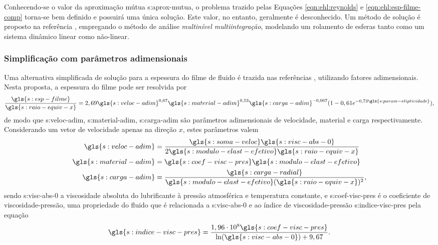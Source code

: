 \documentclass[12pt,oneside,english,brazil,lmodern,siglas,simbolos,cite=num]{ucsmonograph}
\begin{document}
	Conhecendo-se o valor da aproximação mútua \gls{s:aprox-mutua}, o problema trazido pelas Equações \ref{eqn:ehl:reynolds} e \ref{eqn:ehl:esp-filme-comp} torna-se bem definido e possuirá uma única solução.
	Este valor, no entanto, geralmente é desconhecido.
	Um método de solução é proposto na referência \cite{nonato:2010}, empregando o método de análise \emph{multinível multiintegração}, modelando um rolamento de esferas tanto como um sistema dinâmico linear como não-linear.
	
	\subsubsection{Simplificação com parâmetros adimensionais} \label{sec:ehl:simpl}
	Uma alternativa simplificada de solução para a espessura do filme de fluido é trazida nas referências \cite{hamrock:1991,spikes:2006}, utilizando fatores adimensionais.
	Nesta proposta, a espessura do filme pode ser resolvida por
	\begin{equation} \label{eqn:ehl:esp-filme}
		\frac{\gls{s:esp-filme}}{\gls{s:raio-equiv-x}} = 
		2,69\gls{s:veloc-adim}^{0,67}\gls{s:material-adim}^{0,53}
		\gls{s:carga-adim}^{-0,067}
		(1-0,61e^{-0,73\gls{s:param-elipticidade}}),
	\end{equation}
	de modo que \gls{s:veloc-adim}, \gls{s:material-adim}, \gls{s:carga-adim} são parâmetros adimensionais de velocidade, material e carga respectivamente.
	Considerando um vetor de velocidade apenas na direção $x$, estes parâmetros valem \cite{hamrock:1991}
	\begin{align}
		\gls{s:veloc-adim} &= \frac{\gls{s:soma-veloc}\gls{s:visc-abs-0}}
		{2\gls{s:modulo-elast-efetivo}\gls{s:raio-equiv-x}}
		\label{eqn:ehl:veloc-adim}\\
		\gls{s:material-adim} &= \gls{s:coef-visc-pres}
		\gls{s:modulo-elast-efetivo} \label{eqn:ehl:material-adim}\\
		\gls{s:carga-adim} &= \frac{\gls{s:carga-radial}}
		{\gls{s:modulo-elast-efetivo}(\gls{s:raio-equiv-x})^2}
		\label{eqn:ehl:carga-adim},
	\end{align}
	sendo \gls{s:visc-abs-0} a viscosidade absoluta do lubrificante à pressão atmosférica e temperatura constante, e \gls{s:coef-visc-pres} é o coeficiente de viscosidade-pressão, uma propriedade do fluido que é relacionada a \gls{s:visc-abs-0} e ao índice de viscosidade-pressão \gls{s:indice-visc-pres} pela equação \cite{wijnant:1998}
	\begin{equation} \label{eqn:ehl:indice-visc-pressao}
		\gls{s:indice-visc-pres} = 
		\frac{1,96\cdot10^8\gls{s:coef-visc-pres}}
		{\ln(\gls{s:visc-abs-0})+9,67}.
	\end{equation}
	
\end{document}
